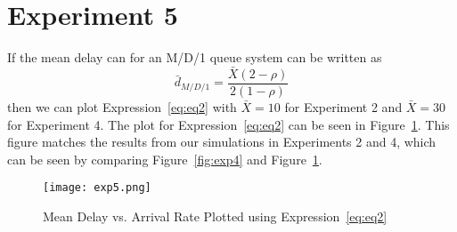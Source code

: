\section*{Experiment 5}
If the mean delay can for an M/D/1 queue system can be written as
\begin{equation}
	\bar{d}_{M/D/1}=\frac{\bar{X}(2-\rho)}{2(1-\rho)}
	\label{eq:eq2}
\end{equation}
then we can plot Expression~\ref{eq:eq2} with $\bar{X}=10$ for Experiment 2 and  $\bar{X}=30$ for Experiment 4. The plot for Expression~\ref{eq:eq2} can be seen in Figure~\ref{fig:exp5}. This figure matches the results from our simulations in Experiments 2 and 4, which can be seen by comparing Figure~\ref{fig:exp4} and Figure~\ref{fig:exp5}.


\begin{figure}[h]
    \centering
    \texttt{[image: exp5.png]}
    \caption{\label{fig:exp5}Mean Delay vs. Arrival Rate Plotted using Expression~\ref{eq:eq2}}
\end{figure}

\clearpage